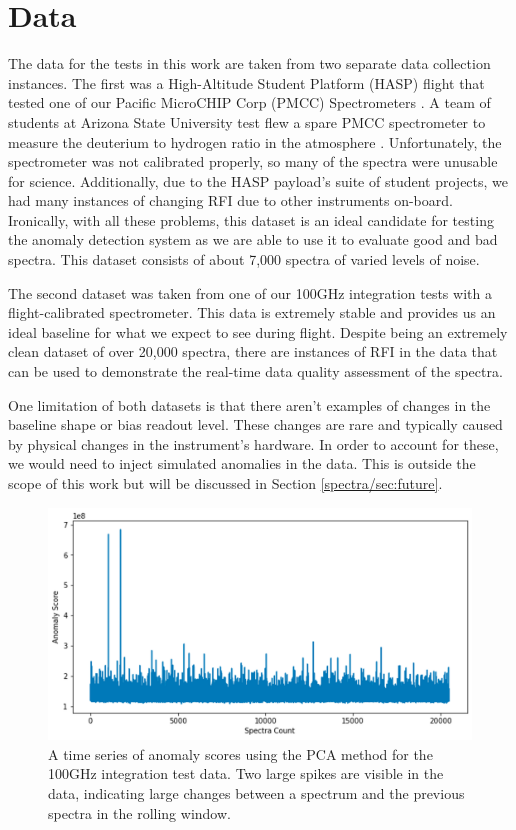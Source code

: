 \section{Data}
\label{spectra/sec:data}
The data for the tests in this work are taken from two separate data collection instances. 
The first was a High-Altitude Student Platform (HASP) flight \parencite{guzik2008development} that tested one of our Pacific MicroCHIP Corp (PMCC) Spectrometers  \parencite{mohammed2024digital}.
A team of students at Arizona State University test flew a spare PMCC spectrometer to measure the deuterium to hydrogen ratio in the atmosphere \parencite{HADHR}.
Unfortunately, the spectrometer was not calibrated properly, so many of the spectra were unusable for science. 
Additionally, due to the HASP payload's suite of student projects, we had many instances of changing RFI due to other instruments on-board. 
Ironically, with all these problems, this dataset is an ideal candidate for testing the anomaly detection system as we are able to use it to evaluate good and bad spectra. 
This dataset consists of about 7,000 spectra of varied levels of noise. 

The second dataset was taken from one of our 100GHz integration tests with a flight-calibrated spectrometer. 
This data is extremely stable and provides us an ideal baseline for what we expect to see during flight.
Despite being an extremely clean dataset of over 20,000 spectra, there are instances of RFI in the data that can be used to demonstrate the real-time data quality assessment of the spectra. 

One limitation of both datasets is that there aren't examples of changes in the baseline shape or bias readout level. 
These changes are rare and typically caused by physical changes in the instrument's hardware. 
In order to account for these, we would need to inject simulated anomalies in the data.
This is outside the scope of this work but will be discussed in Section \ref{spectra/sec:future}.

\begin{figure}[b]
    \centering
    \includegraphics[width=0.5\linewidth]{figs/spectra/asthros_timeseries.png}
    \caption[Anomaly Score Over Time During the 100GHz Integration Test]{A time series of anomaly scores using the PCA method for the 100GHz integration test data. Two large spikes are visible in the data, indicating large changes between a spectrum and the previous spectra in the rolling window.}
    \label{spectra/fig:timeseries}
\end{figure}


